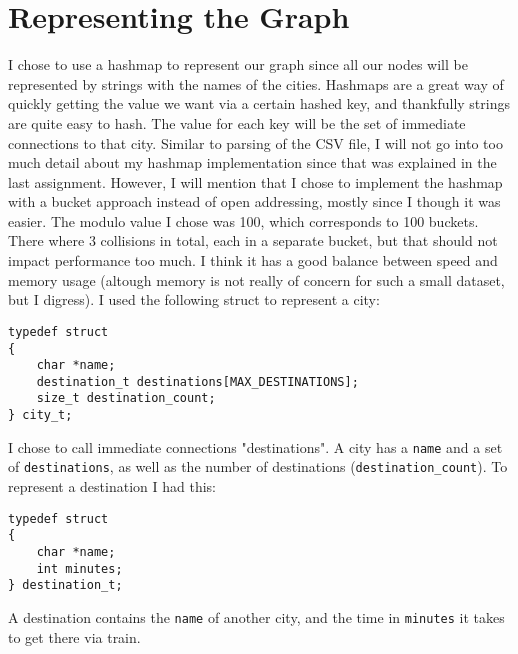 \documentclass[a4paper, 11pt]{article}
\begin{document}
\section{Representing the Graph}
	I chose to use a hashmap to represent our graph since all our nodes will be represented by strings with the names of the cities.
	Hashmaps are a great way of quickly getting the value we want via a certain hashed key, and thankfully strings are quite easy to hash.
	The value for each key will be the set of immediate connections to that city.
	Similar to parsing of the CSV file, I will not go into too much detail about my hashmap implementation since that was explained in the last assignment.
	However, I will mention that I chose to implement the hashmap with a bucket approach instead of open addressing,
	mostly since I though it was easier.
	The modulo value I chose was 100, which corresponds to 100 buckets.
	There where 3 collisions in total, each in a separate bucket, but that should not impact performance too much.
	I think it has a good balance between speed and memory usage (altough memory is not really of concern for such a small dataset, but I digress).
	I used the following struct to represent a city:
	\begin{verbatim}
typedef struct
{
	char *name;
	destination_t destinations[MAX_DESTINATIONS];
	size_t destination_count;
} city_t;
	\end{verbatim}
	I chose to call immediate connections "destinations".
	A city has a \texttt{name} and a set of \texttt{destinations}, as well as the number of destinations (\texttt{destination\_count}).
	To represent a destination I had this:
	\begin{verbatim}
typedef struct
{
	char *name;
	int minutes;
} destination_t;
	\end{verbatim}
	A destination contains the \texttt{name} of another city, and the time in \texttt{minutes} it takes to get there via train.
\end{document}
